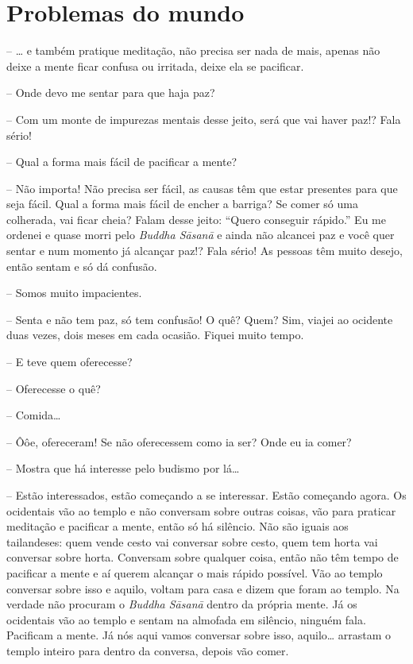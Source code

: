 
\chapter{Problemas do mundo}
\markright{\theChapterAuthor}

-- \ldots{} e também pratique meditação, não precisa ser nada de mais,
apenas não deixe a mente ficar confusa ou irritada, deixe ela se
pacificar.

-- Onde devo me sentar para que haja paz?

-- Com um monte de impurezas mentais desse jeito, será que vai
haver paz!? Fala sério!

-- Qual a forma mais fácil de pacificar a mente?

-- Não importa! Não precisa ser fácil, as causas têm que estar
presentes para que seja fácil. Qual a forma mais fácil de encher a
barriga? Se comer só uma colherada, vai ficar cheia? Falam desse jeito:
“Quero conseguir rápido.” Eu me ordenei e quase morri pelo
\emph{Buddha Sāsanā} e ainda não alcancei paz e você quer sentar e
num momento já alcançar paz!? Fala sério! As pessoas têm muito desejo,
então sentam e só dá confusão.

-- Somos muito impacientes.

-- Senta e não tem paz, só tem confusão! O quê? Quem? Sim, viajei
ao ocidente duas vezes, dois meses em cada ocasião. Fiquei muito tempo.

-- E teve quem oferecesse?

-- Oferecesse o quê?

-- Comida\ldots{}

-- Ôôe, ofereceram! Se não oferecessem como ia ser? Onde eu ia
comer?

-- Mostra que há interesse pelo budismo por lá\ldots{}

-- Estão interessados, estão começando a se interessar. Estão
começando agora. Os ocidentais vão ao templo e não conversam sobre
outras coisas, vão para praticar meditação e pacificar a mente, então
só há silêncio. Não são iguais aos tailandeses: quem vende cesto vai
conversar sobre cesto, quem tem horta vai conversar sobre horta.
Conversam sobre qualquer coisa, então não têm tempo de pacificar a
mente e aí querem alcançar o mais rápido possível. Vão ao templo
conversar sobre isso e aquilo, voltam para casa e dizem que foram ao
templo. Na verdade não procuram o \emph{Buddha Sāsanā} dentro da
própria mente. Já os ocidentais vão ao templo e sentam na almofada em
silêncio, ninguém fala. Pacificam a mente. Já nós aqui vamos conversar
sobre isso, aquilo\ldots{} arrastam o templo inteiro para dentro da conversa,
depois vão comer.

